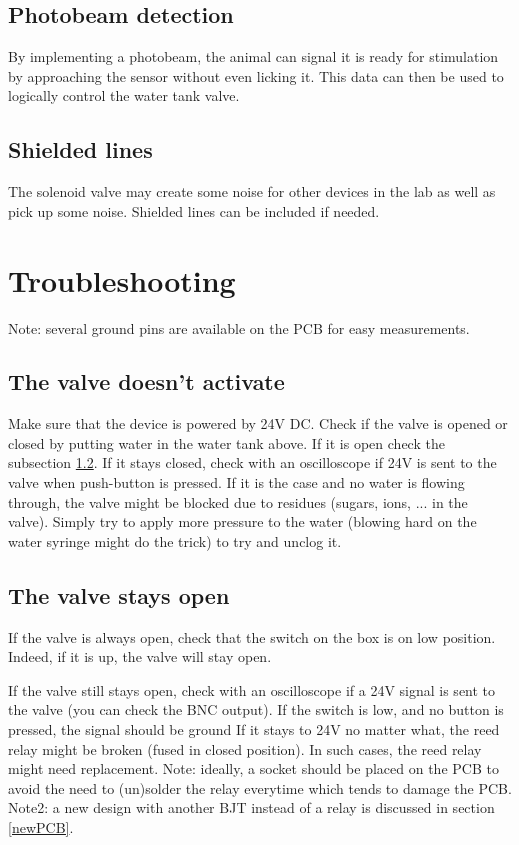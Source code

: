 \documentclass[a4paper]{article}
\begin{document}
\subsection{Photobeam detection}
By implementing a photobeam, the animal can signal it is ready for stimulation by approaching the sensor without even licking it. This data can then be used to logically control the water tank valve.

\subsection{Shielded lines}
The solenoid valve may create some noise for other devices in the lab as well as pick up some noise. Shielded lines can be included if needed.

\section{Troubleshooting}
Note: several ground pins are available on the PCB for easy measurements.
\subsection{The valve doesn't activate}
Make sure that the device is powered by 24V DC.
Check if the valve is opened or closed by putting water in the water tank above.
If it is open check the subsection \ref{staysOpen}.
If it stays closed, check with an oscilloscope if 24V is sent to the valve when push-button is pressed. If it is the case and no water is flowing through, the valve might be blocked due to residues (sugars, ions, ... in the valve). Simply try to apply more pressure to the water (blowing hard on the water syringe might do the trick) to try and unclog it.
\subsection{The valve stays open}
\label{staysOpen}
If the valve is always open, check that the switch on the box is on low position. Indeed, if it is up, the valve will stay open.

If the valve still stays open, check with an oscilloscope if a 24V signal is sent to the valve (you can check the BNC output). If the switch is low, and no button is pressed, the signal should be ground If it stays to 24V no matter what, the reed relay might be broken (fused in closed position). In such cases, the reed relay might need replacement.
Note: ideally, a socket should be placed on the PCB to avoid the need to (un)solder the relay everytime which tends to damage the PCB.
Note2: a new design with another BJT instead of a relay is discussed in section \ref{newPCB}.
\end{document}
